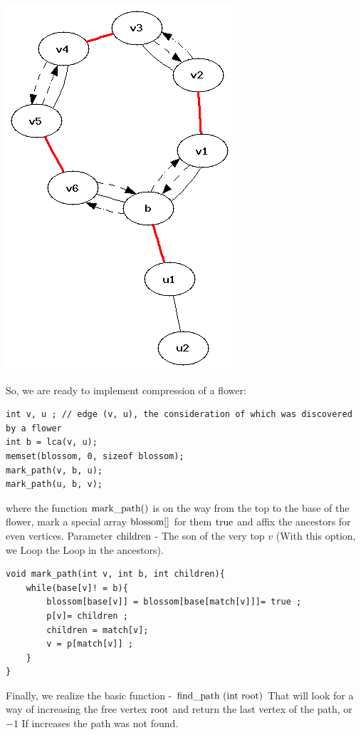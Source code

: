\includegraphics[scale=0.35]{5.png}

So, we are ready to implement compression of a flower:

\begin{verbatim}
int v, u ; // edge (v, u), the consideration of which was discovered by a flower
int b = lca(v, u);
memset(blossom, 0, sizeof blossom);
mark_path(v, b, u);
mark_path(u, b, v); 
\end{verbatim}
where the function $\rm mark \_path()$ is on the way from the top to the base of the flower, mark a special array $\rm blossom []$ for them $\rm true$ and affix the ancestors for even vertices. Parameter $\rm children$ - The son of the very top $v$ (With this option, we Loop the Loop in the ancestors).

\begin{verbatim}
void mark_path(int v, int b, int children){
    while(base[v]! = b){
        blossom[base[v]] = blossom[base[match[v]]]= true ;
        p[v]= children ;
        children = match[v];
        v = p[match[v]] ;
    }
} 
\end{verbatim}
Finally, we realize the basic function - $\rm find \_path ~ (int ~ root)$ That will look for a way of increasing the free vertex $\rm root$ and return the last vertex of the path, or $-1$ If increases the path was not found.

